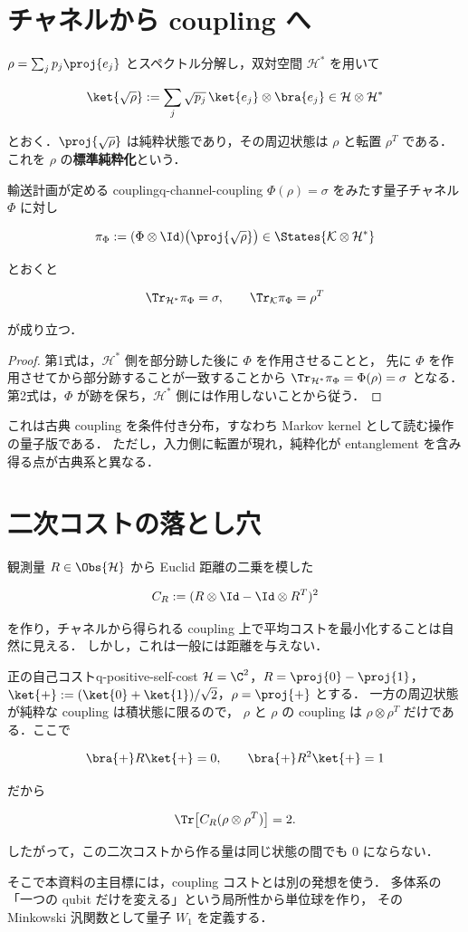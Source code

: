 \section{チャネルから coupling へ}

$\rho=\sum_jp_j\proj{e_j}$ とスペクトル分解し，双対空間 $\mathcal{H}^*$ を用いて

\[
  \ket{\sqrt\rho}
  :=\sum_j\sqrt{p_j}\,\ket{e_j}\otimes\bra{e_j}
  \in\mathcal{H}\otimes\mathcal{H}^*
\]

とおく．$\proj{\sqrt\rho}$ は純粋状態であり，その周辺状態は $\rho$ と転置 $\rho^T$ である．
これを $\rho$ の\textbf{標準純粋化}という．

\begin{proposition}{輸送計画が定める coupling}{q-channel-coupling}
  $\Phi(\rho)=\sigma$ をみたす量子チャネル $\Phi$ に対し

  \[
    \pi_\Phi
    :=(\Phi\otimes\Id)\bigl(\proj{\sqrt\rho}\bigr)
    \in\States{\mathcal{K}\otimes\mathcal{H}^*}
  \]

  とおくと

  \[
    \Tr_{\mathcal{H}^*}\pi_\Phi=\sigma,
    \qquad
    \Tr_{\mathcal{K}}\pi_\Phi=\rho^T
  \]

  が成り立つ．
\end{proposition}

\begin{proof}
  第1式は，$\mathcal{H}^*$ 側を部分跡した後に $\Phi$ を作用させることと，
  先に $\Phi$ を作用させてから部分跡することが一致することから
  $\Tr_{\mathcal{H}^*}\pi_\Phi=\Phi(\rho)=\sigma$ となる．
  第2式は，$\Phi$ が跡を保ち，$\mathcal{H}^*$ 側には作用しないことから従う．
\end{proof}

これは古典 coupling を条件付き分布，すなわち Markov kernel として読む操作の量子版である．
ただし，入力側に転置が現れ，純粋化が entanglement を含み得る点が古典系と異なる．

\section{二次コストの落とし穴}

観測量 $R\in\Obs{\mathcal{H}}$ から Euclid 距離の二乗を模した

\[
  C_R:=(R\otimes\Id-\Id\otimes R^T)^2
\]

を作り，チャネルから得られる coupling 上で平均コストを最小化することは自然に見える．
しかし，これは一般には距離を与えない．

\begin{example}{正の自己コスト}{q-positive-self-cost}
  $\mathcal{H}=\C^2$，$R=\proj{0}-\proj{1}$，
  $\ket{+}:=(\ket{0}+\ket{1})/\sqrt2$，$\rho=\proj{+}$ とする．
  一方の周辺状態が純粋な coupling は積状態に限るので，
  $\rho$ と $\rho$ の coupling は $\rho\otimes\rho^T$ だけである．ここで

  \[
    \bra{+}R\ket{+}=0,
    \qquad
    \bra{+}R^2\ket{+}=1
  \]

  だから

  \[
    \Tr\!\left[C_R(\rho\otimes\rho^T)\right]=2.
  \]

  したがって，この二次コストから作る量は同じ状態の間でも $0$ にならない．
\end{example}

そこで本資料の主目標には，coupling コストとは別の発想を使う．
多体系の「一つの qubit だけを変える」という局所性から単位球を作り，
その Minkowski 汎関数として量子 $W_1$ を定義する．
